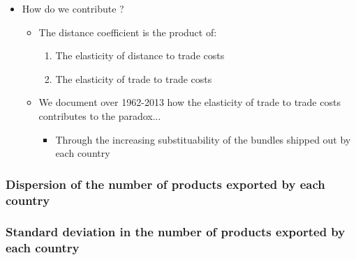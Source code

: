 \documentclass{beamer}
\begin{document}
\begin{frame}[plain]
\begin{itemize}
\item How do we contribute ?
\begin{itemize}
	\item The distance coefficient is the product of:
	\begin{enumerate}
		\item The elasticity of distance to trade costs
		\item The elasticity of trade to trade costs
	\end{enumerate}
	\item We document over 1962-2013 how the elasticity of trade to trade costs contributes to the paradox...
	\begin{itemize}
		\item Through the increasing substituability of the bundles shipped out by each country
	\end{itemize}
	\vspace{0.3cm}
\end{itemize}
\end{itemize}
\end{frame}

\begin{frame}[plain]\frametitle{Dispersion of the number of products exported by each country}
\begin{figure}
	\begin{center}
		\setlength{\fboxrule}{1pt} %
		\setlength{\fboxsep}{.1in} %
	\end{center}
\end{figure}
\end{frame}


\begin{frame}[plain]\frametitle{Standard deviation in the number of products exported by each country }
\begin{figure}[h!]
	\begin{center}
		\setlength{\fboxrule}{1pt} %
		\setlength{\fboxsep}{.1in} %
	\end{center}
\end{figure}
\end{frame}
\end{document}

